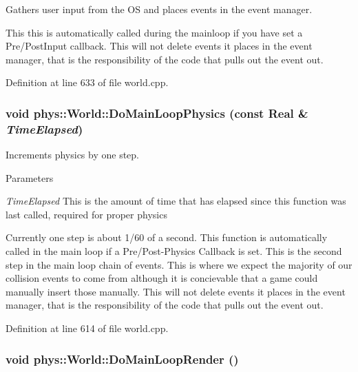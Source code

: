 Gathers user input from the OS and places events in the event manager. 

This this is automatically called during the mainloop if you have set a Pre/PostInput callback. This will not delete events it places in the event manager, that is the responsibility of the code that pulls out the event out. 

Definition at line 633 of file world.cpp.

\hypertarget{classphys_1_1World_a4596a7bd1dc49c3b45b5562fcd0d08f2}{
\subsubsection[{DoMainLoopPhysics}]{\setlength{\rightskip}{0pt plus 5cm}void phys::World::DoMainLoopPhysics (const {\bf Real} \& {\em TimeElapsed})}}
\label{da/ddf/classphys_1_1World_a4596a7bd1dc49c3b45b5562fcd0d08f2}


Increments physics by one step. 


\begin{DoxyParams}{Parameters}
\item[{\em TimeElapsed}]This is the amount of time that has elapsed since this function was last called, required for proper physics\end{DoxyParams}
Currently one step is about 1/60 of a second. This function is automatically called in the main loop if a Pre/Post-\/Physics Callback is set. This is the second step in the main loop chain of events. This is where we expect the majority of our collision events to come from although it is concievable that a game could manually insert those manually. This will not delete events it places in the event manager, that is the responsibility of the code that pulls out the event out. 

Definition at line 614 of file world.cpp.

\hypertarget{classphys_1_1World_a34133dd084f575a51209458dbe9ecdac}{
\subsubsection[{DoMainLoopRender}]{\setlength{\rightskip}{0pt plus 5cm}void phys::World::DoMainLoopRender ()}}
\label{da/ddf/classphys_1_1World_a34133dd084f575a51209458dbe9ecdac}


